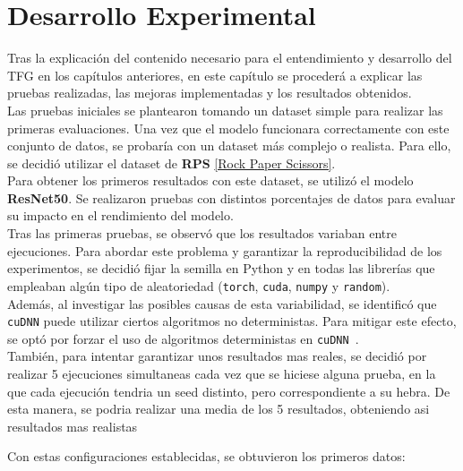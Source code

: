 
\chapter{Desarrollo Experimental}\label{ch:desarrollo-experimental}

Tras la explicación del contenido necesario para el entendimiento y desarrollo del TFG en los capítulos anteriores, en
este capítulo se procederá a explicar las pruebas realizadas, las mejoras implementadas y los resultados obtenidos.
\\[6pt]

Las pruebas iniciales se plantearon tomando un dataset simple para realizar las primeras evaluaciones.
Una vez que el modelo funcionara correctamente con este conjunto de datos, se probaría con un dataset más complejo o
realista.
Para ello, se decidió utilizar el dataset de \textbf{RPS} \hyperref[subsec:rock-paper-scissors]{[Rock Paper Scissors]}.
\\[6pt]

Para obtener los primeros resultados con este dataset, se utilizó el modelo \textbf{ResNet50}.
Se realizaron pruebas con distintos porcentajes de datos para evaluar su impacto en el rendimiento del modelo. \\[6pt]

Tras las primeras pruebas, se observó que los resultados variaban entre ejecuciones.
Para abordar este problema y garantizar la reproducibilidad de los experimentos, se decidió fijar la semilla en Python
y en todas las librerías que empleaban algún tipo de aleatoriedad (\texttt{torch}, \texttt{cuda}, \texttt{numpy} y
\texttt{random}). \\[6pt]

Además, al investigar las posibles causas de esta variabilidad, se identificó que \texttt{cuDNN} puede utilizar ciertos
algoritmos no deterministas.
Para mitigar este efecto, se optó por forzar el uso de algoritmos deterministas en
\texttt{cuDNN}~\cite{noauthor_cublas_nodate}. \\[6pt]

También, para intentar garantizar unos resultados mas reales, se decidió por realizar 5 ejecuciones simultaneas cada
vez que se hiciese alguna prueba, en la que cada ejecución tendria un seed distinto, pero correspondiente a su hebra.
De esta manera, se podria realizar una media de los 5 resultados, obteniendo asi resultados mas realistas

Con estas configuraciones establecidas, se obtuvieron los primeros datos:


